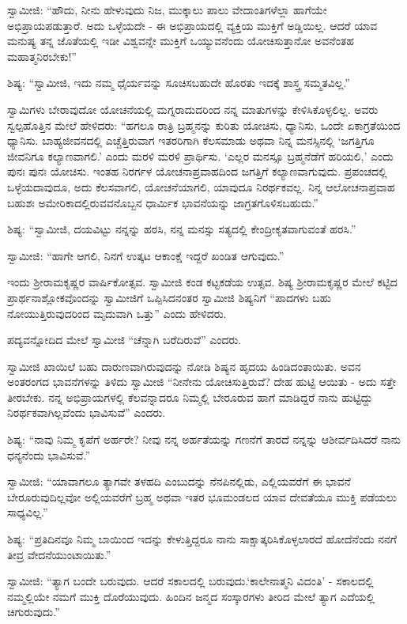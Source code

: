  ಸ್ವಾಮೀಜಿ: “ಹೌದು, ನೀನು ಹೇಳುವುದು ನಿಜ, ಮುಕ್ಕಾಲು ಪಾಲು ವೇದಾಂತಿಗಳೆಲ್ಲಾ ಹಾಗೆಯೇ ಅಭಿಪ್ರಾಯಪಡುತ್ತಾರೆ. ಅದು ಒಳ್ಳೆಯದೇ - ಈ ಅಭಿಪ್ರಾಯದಲ್ಲಿ ವ್ಯಕ್ತಿಯ ಮುಕ್ತಿಗೆ ಅಡ್ಡಿಯಿಲ್ಲ. ಆದರೆ ಯಾವ ಮನುಷ್ಯ ತನ್ನ ಜೊತೆಯಲ್ಲಿ ಇಡೀ ವಿಶ್ವವನ್ನೇ ಮುಕ್ತಿಗೆ ಒಯ್ಯುವನೆಂದು ಯೋಚಿಸುತ್ತಾನೋ ಅವನೆಂತಹ ಮಹಾತ್ಮನಿರಬೇಕು!” 

 ಶಿಷ್ಯ: “ಸ್ವಾಮೀಜಿ, ಇದು ನಮ್ಮ ಧೈರ್ಯವನ್ನು ಸೂಚಿಸಬಹುದೇ ಹೊರತು ಇದಕ್ಕೆ ಶಾಸ್ತ್ರ ಸಮ್ಮತವಿಲ್ಲ.” 

 ಸ್ವಾಮಿಗಳು ಬೇರಾವುದೋ ಯೋಚನೆಯಲ್ಲಿ ಮಗ್ನರಾದುದರಿಂದ ನನ್ನ ಮಾತುಗಳನ್ನು ಕೇಳಿಸಿಕೊಳ್ಳಲಿಲ್ಲ. ಅವರು ಸ್ವಲ್ಪಹೊತ್ತಿನ ಮೇಲೆ ಹೇಳಿದರು: “ಹಗಲೂ ರಾತ್ರಿ ಬ್ರಹ್ಮನನ್ನು ಕುರಿತು ಯೋಚಿಸು, ಧ್ಯಾನಿಸು, ಒಂದೇ ಏಕಾಗ್ರತೆಯಿಂದ ಧ್ಯಾನಿಸು. ಬಾಹ್ಯಜೀವನದಲ್ಲಿ ಎಚ್ಚೆತ್ತಿರುವಾಗ ಇತರರಿಗಾಗಿ ಕೆಲಸಮಾಡು ಅಥವಾ ನಿನ್ನ ಮನಸ್ಸಿನಲ್ಲಿ ‘ಜಗತ್ತಿಗೂ ಜೀವನಿಗೂ ಕಲ್ಯಾಣವಾಗಲಿ.’ ಎಂದು ಮರಳಿ ಮರಳಿ ಪ್ರಾರ್ಥಿಸು. ‘ಎಲ್ಲರ ಮನಸ್ಸೂ ಬ್ರಹ್ಮನೆಡೆಗೆ ಹರಿಯಲಿ,’ ಎಂದು ಪುನಃ ಪುನಃ ಯೋಚಿಸು. ಇಂತಹ ನಿರರ್ಗಳ ಯೋಚನಾಪ್ರವಾಹದಿಂದ ಜಗತ್ತಿಗೆ ಕಲ್ಯಾಣವಾಗುವುದು. ಪ್ರಪಂಚದಲ್ಲಿ ಒಳ್ಳೆಯದಾವುದೂ, ಅದು ಕೆಲಸವಾಗಲಿ, ಯೋಚನೆಯಾಗಲಿ, ಯಾವುದೂ ನಿರರ್ಥಕವಲ್ಲ. ನಿನ್ನ ಆಲೋಚನಾಪ್ರವಾಹ ಬಹುಶಃ ಅಮೇರಿಕಾದಲ್ಲಿರುವವನೊಬ್ಬನ ಧಾರ್ಮಿಕ ಭಾವನೆಯನ್ನು ಜಾಗ್ರತಗೊಳಿಸಬಹುದು.” 

 ಶಿಷ್ಯ: “ಸ್ವಾಮೀಜಿ, ದಯವಿಟ್ಟು ನನ್ನನ್ನು ಹರಸಿ, ನನ್ನ ಮನಸ್ಸು ಸತ್ಯದಲ್ಲಿ ಕೇಂದ್ರೀಕೃತವಾಗುವಂತೆ ಹರಸಿ.” 

 ಸ್ವಾಮೀಜಿ: “ಹಾಗೇ ಆಗಲಿ, ನಿನಗೆ ಉತ್ಕಟ ಆಕಾಂಕ್ಷೆ ಇದ್ದರೆ ಖಂಡಿತ ಆಗುವುದು.” 

\delimiter

 ಇಂದು ಶ‍್ರೀರಾಮಕೃಷ್ಣರ ವಾರ್ಷಿಕೋತ್ಸವ. ಸ್ವಾಮೀಜಿ ಕಂಡ ಕಟ್ಟಕಡೆಯ ಉತ್ಸವ. ಶಿಷ್ಯ ಶ‍್ರೀರಾಮಕೃಷ್ಣರ ಮೇಲೆ ಕಟ್ಟಿದ ಪ್ರಾರ್ಥನಾಶ್ಲೋಕವೊಂದನ್ನು ಸ್ವಾಮೀಜಿಗೆ ಒಪ್ಪಿಸಿದನಂತರ ಸ್ವಾಮೀಜಿ ಶಿಷ್ಯನಿಗೆ “ಪಾದಗಳು ಬಹು ನೋಯುತ್ತಿರುವುದರಿಂದ ಮೃದುವಾಗಿ ಒತ್ತು” ಎಂದು ಹೇಳಿದರು. 

 ಪದ್ಯವನ್ನೋದಿದ ಮೇಲೆ ಸ್ವಾಮೀಜಿ “ಚೆನ್ನಾಗಿ ಬರೆದಿರುವೆ” ಎಂದರು. 

 ಸ್ವಾಮೀಜಿ ಖಾಯಿಲೆ ಬಹು ದಾರುಣವಾಗಿರುವುದನ್ನು ನೋಡಿ ಶಿಷ್ಯನ ಹೃದಯ ಹಿಂಡಿದಂತಾಯಿತು. ಅವನ ಅಂತರಂಗದ ಭಾವನೆಗಳನ್ನು ತಿಳಿದು ಸ್ವಾಮೀಜಿ “ನೀನೇನು ಯೋಚಿಸುತ್ತಿರುವೆ? ದೇಹ ಹುಟ್ಟಿ ಆಯಿತು - ಅದು ಸತ್ತೇ ತೀರಬೇಕು. ನನ್ನ ಅಭಿಪ್ರಾಯಗಳಲ್ಲಿ ಕೆಲವನ್ನಾದರೂ ನಿಮ್ಮಲ್ಲಿ ಬೇರೂರುವ ಹಾಗೆ ಮಾಡಿದ್ದರೆ ನಾನು ಹುಟ್ಟಿದ್ದು ನಿರರ್ಥಕವಾಗಿಲ್ಲವೆಂದು ಭಾವಿಸುವೆ” ಎಂದರು. 

 ಶಿಷ್ಯ: “ನಾವು ನಿಮ್ಮ ಕೃಪೆಗೆ ಅರ್ಹರೇ? ನೀವು ನನ್ನ ಅರ್ಹತೆಯನ್ನು ಗಣನೆಗೆ ತಾರದೆ ನನ್ನನ್ನು ಆಶೀರ್ವದಿಸಿದರೆ ನಾನು ಧನ್ಯನೆಂದು ಭಾವಿಸುವೆ.” 

 ಸ್ವಾಮೀಜಿ: “ಯಾವಾಗಲೂ ತ್ಯಾಗವೇ ತಳಹದಿ ಎಂಬುದನ್ನು ನೆನಪಿನಲ್ಲಿಡು, ಎಲ್ಲಿಯವರೆಗೆ ಈ ಭಾವನೆ ಬೇರೂರುವುದಿಲ್ಲವೋ ಅಲ್ಲಿಯವರೆಗೆ ಬ್ರಹ್ಮ ಅಥವಾ ಇತರ ಭೂಮಂಡಲದ ಯಾವ ದೇವತೆಯೂ ಮುಕ್ತಿ ಪಡೆಯಲು ಸಾಧ್ಯವಿಲ್ಲ.” 

 ಶಿಷ್ಯ: “ಪ್ರತಿದಿನವೂ ನಿಮ್ಮ ಬಾಯಿಂದ ಇದನ್ನು ಕೇಳುತ್ತಿದ್ದರೂ ನಾನು ಸಾಕ್ಷಾತ್ಕರಿಸಿಕೊಳ್ಳಲಾರದೆ ಹೋದೆನೆಂದು ನನಗೆ ತೀವ್ರ ವೇದನೆಯುಂಟಾಯಿತು.” 

 ಸ್ವಾಮೀಜಿ: “ತ್ಯಾಗ ಬಂದೇ ಬರುವುದು. ಆದರೆ ಸಕಾಲದಲ್ಲಿ ಬರುವುದು.\break ‘ಕಾಲೇನಾತ್ಮನಿ ವಿದಂತಿ’ - ಸಕಾಲದಲ್ಲಿ ನಮ್ಮಲ್ಲಿಯೇ ನಮಗೆ ಮುಕ್ತಿ ದೊರೆಯುವುದು. ಹಿಂದಿನ ಜನ್ಮದ ಸಂಸ್ಕಾರಗಳು ತೀರಿದ ಮೇಲೆ ತ್ಯಾಗ ಎದೆಯಲ್ಲಿ ಚಿಗುರುವುದು.” 

